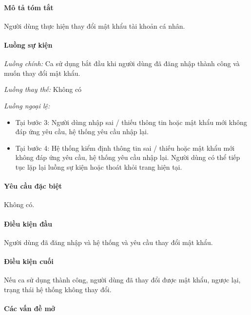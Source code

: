\documentclass[./../main.tex]{subfiles}
\begin{document}
\paragraph*{Mô tả tóm tắt}

Người dùng thực hiện thay đổi mật khẩu tài khoản cá nhân.

\paragraph*{Luồng sự kiện}

\emph{Luồng chính:} Ca sử dụng bắt đầu khi người dùng đã đăng nhập thành công và muốn thay đổi mật khẩu.

\emph{Luồng thay thế:} Không có

\emph{Luồng ngoại lệ:}

\begin{itemize}
\item
  
  Tại bước 3: Người dùng nhập sai / thiếu thông tin hoặc mật khẩu mới
  không đáp ứng yêu cầu, hệ thống yêu cầu nhập lại.
  
\item
  
  Tại bước 4: Hệ thống kiểm định thông tin sai / thiếu hoặc mật khẩu mới
  không đáp ứng yêu cầu, hệ thống yêu cầu nhập lại. Người dùng có thể
  tiếp tục lặp lại luồng sự kiện hoặc thoát khỏi trang hiện tại.
  
\end{itemize}

\paragraph*{Yêu cầu đặc biệt}

Không có.

\paragraph*{Điều kiện đầu}

Người dùng đã đăng nhập và hệ thống và yêu cầu thay đổi mật khẩu.

\paragraph*{Điều kiện cuối}

Nếu ca sử dụng thành công, người dùng đã thay đổi được mật khẩu, ngược
lại, trạng thái hệ thống không thay đổi.

\paragraph*{Các vấn đề mở}
\end{document}
